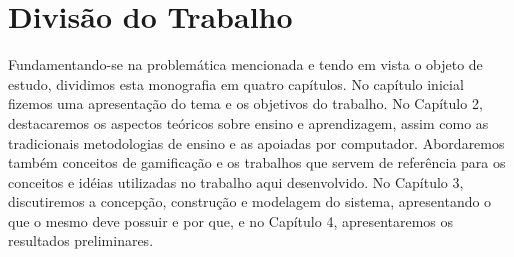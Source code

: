 \section{Divisão do Trabalho}

Fundamentando-se na problemática mencionada e tendo em vista o objeto de estudo, dividimos esta monografia em quatro capítulos. No capítulo inicial fizemos uma apresentação do tema e os objetivos do 
trabalho. No Capítulo 2, destacaremos os aspectos teóricos sobre ensino e aprendizagem, assim como as tradicionais metodologias de ensino e as apoiadas por computador. Abordaremos tamb\'em conceitos 
de gamificação e os trabalhos que servem de refer\^encia para os conceitos e id\'eias utilizadas no trabalho aqui desenvolvido. No Capítulo 3, discutiremos a concepção, construção e modelagem do 
sistema, apresentando o que o mesmo deve possuir e por que, e no Capítulo 4, apresentaremos os resultados preliminares.